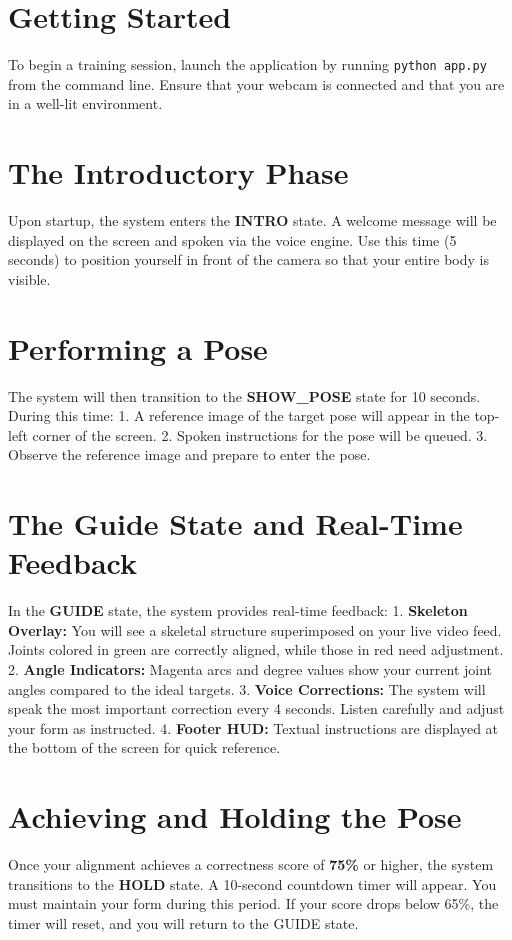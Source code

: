\documentclass[a4paper, 11pt, oneside]{report}
\begin{document}
        \section{Getting Started}
        To begin a training session, launch the application by running \texttt{python app.py} from the command line. Ensure that your webcam is connected and that you are in a well-lit environment.

        \section{The Introductory Phase}
        Upon startup, the system enters the \textbf{INTRO} state. A welcome message will be displayed on the screen and spoken via the voice engine. Use this time (5 seconds) to position yourself in front of the camera so that your entire body is visible.

        \section{Performing a Pose}
        The system will then transition to the \textbf{SHOW\_POSE} state for 10 seconds. During this time:
        1. A reference image of the target pose will appear in the top-left corner of the screen.
        2. Spoken instructions for the pose will be queued.
        3. Observe the reference image and prepare to enter the pose.

        \section{The Guide State and Real-Time Feedback}
        In the \textbf{GUIDE} state, the system provides real-time feedback:
        1. \textbf{Skeleton Overlay:} You will see a skeletal structure superimposed on your live video feed. Joints colored in green are correctly aligned, while those in red need adjustment.
        2. \textbf{Angle Indicators:} Magenta arcs and degree values show your current joint angles compared to the ideal targets.
        3. \textbf{Voice Corrections:} The system will speak the most important correction every 4 seconds. Listen carefully and adjust your form as instructed.
        4. \textbf{Footer HUD:} Textual instructions are displayed at the bottom of the screen for quick reference.

        \section{Achieving and Holding the Pose}
        Once your alignment achieves a correctness score of \textbf{75\%} or higher, the system transitions to the \textbf{HOLD} state. A 10-second countdown timer will appear. You must maintain your form during this period. If your score drops below 65\%, the timer will reset, and you will return to the GUIDE state.
\end{document}

